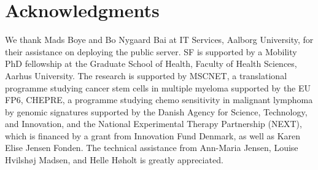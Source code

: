 \documentclass[10pt,letterpaper]{article}
\begin{document}
\section*{Acknowledgments}
We thank Mads Boye and Bo Nygaard Bai at IT Services, Aalborg University, for their assistance on deploying the public server.
SF is supported by a Mobility PhD fellowship at the Graduate School of Health, Faculty of Health Sciences, Aarhus University.
The research is supported by MSCNET, a translational programme studying cancer stem cells in multiple myeloma supported by the EU FP6, CHEPRE, a programme studying chemo sensitivity in malignant lymphoma by genomic signatures supported by the Danish Agency for Science, Technology, and Innovation, and the National Experimental Therapy Partnership (NEXT), which is financed by a grant from Innovation Fund Denmark, as well as Karen Elise Jensen Fonden.
The technical assistance from Ann-Maria Jensen, Louise Hvilsh{\o}j Madsen, and Helle H{\o}holt is greatly appreciated.
\end{document}
